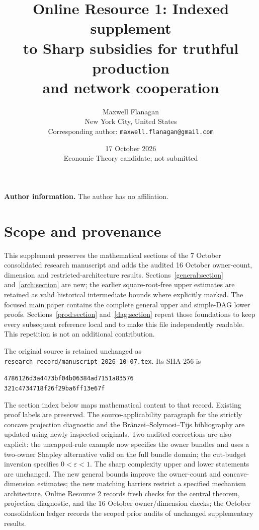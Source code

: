 \documentclass[11pt]{article}
\title{Online Resource 1: Indexed supplement\\to Sharp subsidies for truthful production\\and network cooperation}
\author{Maxwell Flanagan\\[2pt]\small New York City, United States\\[2pt]\small Corresponding author: \texttt{maxwell.flanagan@gmail.com}}
\date{17 October 2026\\[2pt]\small Economic Theory candidate; not submitted}
\theoremstyle{definition}\newtheorem{definition}[theorem]{Definition}
\theoremstyle{remark}\newtheorem{remark}[theorem]{Remark}
\begin{document}
\maketitle
\noindent\textbf{Author information.} The author has no affiliation.

\section*{Scope and provenance}
This supplement preserves the mathematical sections of the 7 October
consolidated research manuscript and adds the audited 16 October owner-count,
dimension and restricted-architecture results. Sections~\ref{general:section}
and~\ref{arch:section} are new; the earlier square-root-free upper estimates
are retained as valid historical intermediate bounds where explicitly marked. The focused main paper contains the complete
general upper and simple-DAG lower proofs. Sections~\ref{prod:section}
and~\ref{dag:section} repeat those foundations to keep every subsequent
reference local and to make this file independently readable. This repetition
is not an additional contribution.

The original source is retained unchanged as
\texttt{research\_record/manuscript\_2026-10-07.tex}. Its SHA-256 is
\begin{center}\small\texttt{4786126d3a4473bf04b06384ad7151a83576}\\
\texttt{321c4734718f26f29ba6ff13e67f}\end{center}
The section index below maps mathematical content to that record. Existing
proof labels are preserved. The source-applicability paragraph for the strictly
concave projection diagnostic and the Br\^anzei--Solymosi--Tijs bibliography
are updated using newly inspected originals. Two audited corrections are
also explicit: the uncapped-rule example now specifies the owner bundles
and uses a two-owner Shapley alternative valid on the full bundle domain;
the cut-budget inversion specifies $0<\varepsilon<1$. The sharp complexity upper and lower statements are unchanged. The new
general bounds improve the owner-count and concave-dimension estimates;
the new matching barriers restrict a specified mechanism architecture. Online Resource 2 records fresh checks for the
central theorem, projection diagnostic, and the 16 October owner/dimension
checks; the October consolidation ledger
records the scoped prior audits of unchanged supplementary results.
\end{document}
